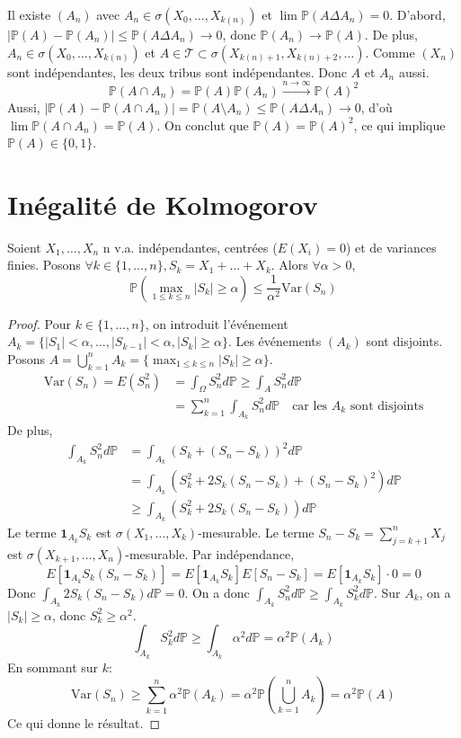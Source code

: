 Il existe $(A_n)$ avec $A_n \in \sigma(X_0, \dots, X_{k(n)})$ et $\lim \mathbb{P}(A \Delta A_n) = 0$.
D'abord, $|\mathbb{P}(A) - \mathbb{P}(A_n)| \le \mathbb{P}(A \Delta A_n) \to 0$, donc $\mathbb{P}(A_n) \to \mathbb{P}(A)$.
De plus, $A_n \in \sigma(X_0, \dots, X_{k(n)})$ et $A \in \mathcal{T} \subset \sigma(X_{k(n)+1}, X_{k(n)+2}, \dots)$.
Comme $(X_n)$ sont indépendantes, les deux tribus sont indépendantes. Donc $A$ et $A_n$ aussi.
\[ \mathbb{P}(A \cap A_n) = \mathbb{P}(A) \mathbb{P}(A_n) \xrightarrow{n \to \infty} \mathbb{P}(A)^2 \]
Aussi, $|\mathbb{P}(A) - \mathbb{P}(A \cap A_n)| = \mathbb{P}(A \setminus A_n) \le \mathbb{P}(A \Delta A_n) \to 0$, d'où $\lim \mathbb{P}(A \cap A_n) = \mathbb{P}(A)$.
On conclut que $\mathbb{P}(A) = \mathbb{P}(A)^2$, ce qui implique $\mathbb{P}(A) \in \{0,1\}$.
\section{Inégalité de Kolmogorov}
\begin{theorem}
Soient $X_1, \dots, X_n$ n v.a. indépendantes, centrées ($E(X_i)=0$) et de variances finies.
Posons $\forall k \in \{1, \dots, n\}, S_k = X_1 + \dots + X_k$.
Alors $\forall \alpha > 0$,
\[ \mathbb{P}(\max_{1 \le k \le n} |S_k| \ge \alpha) \le \frac{1}{\alpha^2} \mathrm{Var}(S_n) \]
\end{theorem}
\begin{proof}
Pour $k \in \{1, \dots, n\}$, on introduit l'événement $A_k = \{|S_1| < \alpha, \dots, |S_{k-1}| < \alpha, |S_k| \ge \alpha\}$.
Les événements $(A_k)$ sont disjoints. Posons $A = \bigcup_{k=1}^n A_k = \{ \max_{1 \le k \le n} |S_k| \ge \alpha \}$.
\begin{align*}
    \mathrm{Var}(S_n) = E(S_n^2) &= \int_\Omega S_n^2 d\mathbb{P} \ge \int_A S_n^2 d\mathbb{P} \\
    &= \sum_{k=1}^n \int_{A_k} S_n^2 d\mathbb{P} \quad \text{car les } A_k \text{ sont disjoints}
\end{align*}
De plus, 
\begin{align*}
    \int_{A_k} S_n^2 d\mathbb{P} &= \int_{A_k} (S_k + (S_n - S_k))^2 d\mathbb{P} \\
    &= \int_{A_k} \left( S_k^2 + 2S_k(S_n - S_k) + (S_n - S_k)^2 \right) d\mathbb{P} \\
    &\ge \int_{A_k} \left( S_k^2 + 2S_k(S_n - S_k) \right) d\mathbb{P}
\end{align*}
Le terme $\mathbf{1}_{A_k} S_k$ est $\sigma(X_1, \dots, X_k)$-mesurable. Le terme $S_n - S_k = \sum_{j=k+1}^n X_j$ est $\sigma(X_{k+1}, \dots, X_n)$-mesurable. Par indépendance,
\[ E[\mathbf{1}_{A_k} S_k (S_n - S_k)] = E[\mathbf{1}_{A_k} S_k] E[S_n - S_k] = E[\mathbf{1}_{A_k} S_k] \cdot 0 = 0 \]
Donc $\int_{A_k} 2S_k(S_n - S_k) d\mathbb{P} = 0$.
On a donc $\int_{A_k} S_n^2 d\mathbb{P} \ge \int_{A_k} S_k^2 d\mathbb{P}$.
Sur $A_k$, on a $|S_k| \ge \alpha$, donc $S_k^2 \ge \alpha^2$.
\[ \int_{A_k} S_k^2 d\mathbb{P} \ge \int_{A_k} \alpha^2 d\mathbb{P} = \alpha^2 \mathbb{P}(A_k) \]
En sommant sur $k$:
\[ \mathrm{Var}(S_n) \ge \sum_{k=1}^n \alpha^2 \mathbb{P}(A_k) = \alpha^2 \mathbb{P}\left(\bigcup_{k=1}^n A_k\right) = \alpha^2 \mathbb{P}(A) \]
Ce qui donne le résultat.
\end{proof}
